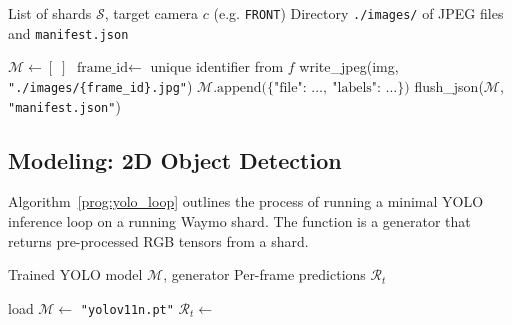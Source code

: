 \begin{algorithm}[H]
  \caption{Offline Pre-extraction (Training Mode)}
  \label{prog:offline_extract}
  \begin{algorithmic}[1]
  \Require List of shards $\mathcal{S}$, target camera $c$ (e.g. \texttt{FRONT})
  \Ensure Directory \texttt{./images/} of JPEG files and \texttt{manifest.json}

  \State $\mathcal{M} \gets [\;]$ 
          \State $\text{frame\_id} \gets$ unique identifier from $f$
          \State write\_jpeg(img, \texttt{"./images/\{frame\_id\}.jpg"})
          \State $\mathcal{M}.\text{append}\bigl(\{\text{"file": } \ldots,\ \text{"labels": } \ldots\}\bigr)$
      \EndFor
  \EndFor
  \State flush\_json($\mathcal{M}$, \texttt{"manifest.json"})
  \end{algorithmic}
\end{algorithm}



\subsection{Modeling: 2D Object Detection}

Algorithm~\ref{prog:yolo_loop} outlines the process of running a minimal YOLO inference loop on a running Waymo shard. The function  is a generator that returns pre-processed RGB tensors from a shard. 

\begin{algorithm}[H]
\caption{Minimal YOLO Inference Loop}
\label{prog:yolo_loop}
\begin{algorithmic}[1]
\Require Trained YOLO model $\mathcal{M}$, generator 
\Ensure Per-frame predictions $\mathcal{R}_t$

\State load $\mathcal{M} \gets$ \texttt{"yolov11n.pt"}
    \State $\mathcal{R}_t \gets$ 
    \State {} 
\EndFor
\end{algorithmic}
\end{algorithm}

